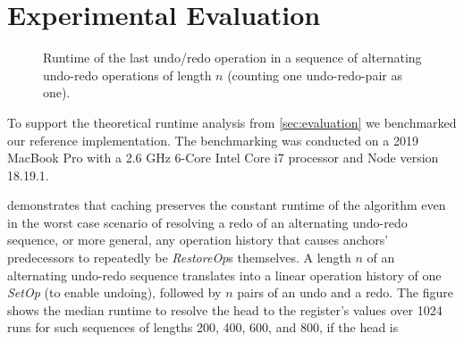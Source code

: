 \documentclass[sigplan,10pt]{acmart}
\newcommand{\setopkind}{\textit{SetOp}}
\newcommand{\restopkind}{\textit{RestoreOp}}
\begin{document}
\section{Experimental Evaluation}

\begin{figure}[b]
\caption{
  Runtime of the last undo/redo operation
  in a sequence of alternating undo-redo operations of length $n$
  (counting one undo-redo-pair as one).
}\label{fig:runtime-undo-redo-alt}
\end{figure}

To support the theoretical runtime analysis from \cref{sec:evaluation}
we benchmarked our reference implementation.
The benchmarking was conducted on a 2019 MacBook Pro with a 
2.6 GHz 6-Core Intel Core i7 processor and Node version 18.19.1.

 demonstrates that caching preserves
the constant runtime of the algorithm even in the worst case scenario of
resolving a redo of an alternating undo-redo sequence, or more general,
any operation history that causes anchors' predecessors to repeatedly be
\restopkind{}s themselves.
A length $n$ of an alternating undo-redo sequence translates into
a linear operation history of one \setopkind{} (to enable undoing),
followed by $n$ pairs of an undo and a redo.
The figure shows the median runtime to resolve the head to the
register's values over 1024 runs for such sequences of
lengths 200, 400, 600, and 800, if the head is
\end{document}
